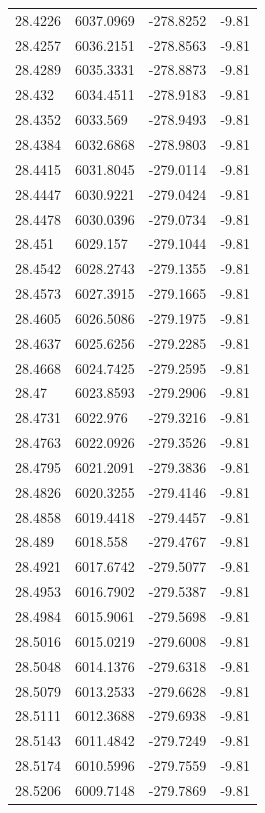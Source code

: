 \begin{table}[H]
\begin{tabular}{llll}
28.4226 & 6037.0969 & -278.8252 & -9.81 \\
28.4257 & 6036.2151 & -278.8563 & -9.81 \\
28.4289 & 6035.3331 & -278.8873 & -9.81 \\
28.432 & 6034.4511 & -278.9183 & -9.81 \\
28.4352 & 6033.569 & -278.9493 & -9.81 \\
28.4384 & 6032.6868 & -278.9803 & -9.81 \\
28.4415 & 6031.8045 & -279.0114 & -9.81 \\
28.4447 & 6030.9221 & -279.0424 & -9.81 \\
28.4478 & 6030.0396 & -279.0734 & -9.81 \\
28.451 & 6029.157 & -279.1044 & -9.81 \\
28.4542 & 6028.2743 & -279.1355 & -9.81 \\
28.4573 & 6027.3915 & -279.1665 & -9.81 \\
28.4605 & 6026.5086 & -279.1975 & -9.81 \\
28.4637 & 6025.6256 & -279.2285 & -9.81 \\
28.4668 & 6024.7425 & -279.2595 & -9.81 \\
28.47 & 6023.8593 & -279.2906 & -9.81 \\
28.4731 & 6022.976 & -279.3216 & -9.81 \\
28.4763 & 6022.0926 & -279.3526 & -9.81 \\
28.4795 & 6021.2091 & -279.3836 & -9.81 \\
28.4826 & 6020.3255 & -279.4146 & -9.81 \\
28.4858 & 6019.4418 & -279.4457 & -9.81 \\
28.489 & 6018.558 & -279.4767 & -9.81 \\
28.4921 & 6017.6742 & -279.5077 & -9.81 \\
28.4953 & 6016.7902 & -279.5387 & -9.81 \\
28.4984 & 6015.9061 & -279.5698 & -9.81 \\
28.5016 & 6015.0219 & -279.6008 & -9.81 \\
28.5048 & 6014.1376 & -279.6318 & -9.81 \\
28.5079 & 6013.2533 & -279.6628 & -9.81 \\
28.5111 & 6012.3688 & -279.6938 & -9.81 \\
28.5143 & 6011.4842 & -279.7249 & -9.81 \\
28.5174 & 6010.5996 & -279.7559 & -9.81 \\
28.5206 & 6009.7148 & -279.7869 & -9.81 \\

\end{tabular}
\end{table}
